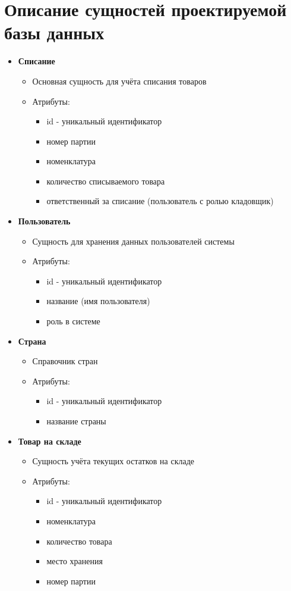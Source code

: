 \section{Описание сущностей проектируемой базы данных}
\begin{itemize}
	\item \textbf{Списание}
	\begin{itemize}
		\item Основная сущность для учёта списания товаров
		\item Атрибуты:
		\begin{itemize}
			\item id - уникальный идентификатор
			\item номер партии
			\item номенклатура
			\item количество списываемого товара
			\item ответственный за списание (пользователь с ролью кладовщик)
		\end{itemize}
	\end{itemize}
	
	\item \textbf{Пользователь}
	\begin{itemize}
		\item Сущность для хранения данных пользователей системы
		\item Атрибуты:
		\begin{itemize}
			\item id - уникальный идентификатор
			\item название (имя пользователя)
			\item роль в системе
		\end{itemize}
	\end{itemize}
	
	\item \textbf{Страна}
	\begin{itemize}
		\item Справочник стран
		\item Атрибуты:
		\begin{itemize}
			\item id - уникальный идентификатор
			\item название страны
		\end{itemize}
	\end{itemize}
	
	\item \textbf{Товар на складе}
	\begin{itemize}
		\item Сущность учёта текущих остатков на складе
		\item Атрибуты:
		\begin{itemize}
			\item id - уникальный идентификатор
			\item номенклатура
			\item количество товара
			\item место хранения
			\item номер партии
		\end{itemize}
	\end{itemize}
	

\end{itemize}
